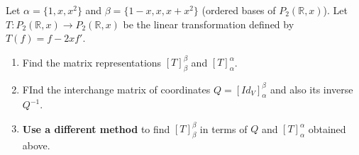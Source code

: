 \documentclass[12pt,answers]{exam}
\newcommand{\R}{\mathbb{R}}
\newenvironment{problem}[2][Problem]{\begin{trivlist}
\item[\hskip \labelsep {\bfseries #1}\hskip \labelsep {\bfseries #2.}]}{\end{trivlist}}
\begin{document}
\begin{problem}{3}
Let $\alpha=\{1,x,x^2\}$ and $\beta=\{1-x,x,x+x^2\}$ (ordered bases of $P_{2}(\R,x)$). Let $T:P_{2}(\R,x)\rightarrow P_{2}(\R,x)$ be the linear transformation defined by $T(f)=f-2xf'$.
\begin{enumerate}[label=\roman*)]
\item Find the matrix representations $[T]^{\beta}_{\beta}$ and $[T]^{\alpha}_{\alpha}$.
\item FInd the interchange matrix of coordinates $Q=[Id_{V}]^{\beta}_{\alpha}$ and also its inverse $Q^{-1}$. 
\item \textbf{Use a different method} to find $[T]^{\beta}_{\beta}$ in terms of $Q$ and $[T]^{\alpha}_{\alpha}$ obtained above.
\end{enumerate}
\end{problem}
\end{document}
